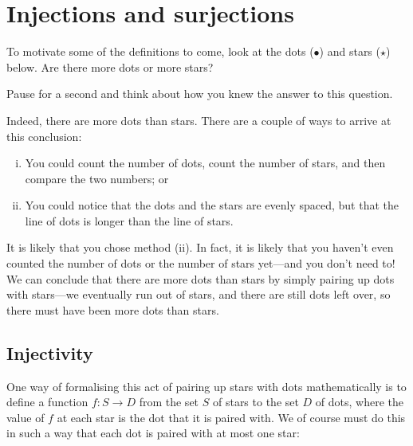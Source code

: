 \section{Injections and surjections}

To motivate some of the definitions to come, look at the dots ($\bullet$) and stars ($\star$) below. Are there more dots or more stars?
\begin{center}
\end{center}

Pause for a second and think about how you knew the answer to this question.

Indeed, there are more dots than stars. There are a couple of ways to arrive at this conclusion:
\begin{enumerate}[(i)] 
\item You could count the number of dots, count the number of stars, and then compare the two numbers; or
\item You could notice that the dots and the stars are evenly spaced, but that the line of dots is longer than the line of stars.
\end{enumerate}
It is likely that you chose method (ii). In fact, it is likely that you haven't even counted the number of dots or the number of stars yet---and you don't need to! We can conclude that there are more dots than stars by simply pairing up dots with stars---we eventually run out of stars, and there are still dots left over, so there must have been more dots than stars.

\subsection*{Injectivity}

One way of formalising this act of pairing up stars with dots mathematically is to define a function $f : S \to D$ from the set $S$ of stars to the set $D$ of dots, where the value of $f$ at each star is the dot that it is paired with. We of course must do this in such a way that each dot is paired with at most one star:

